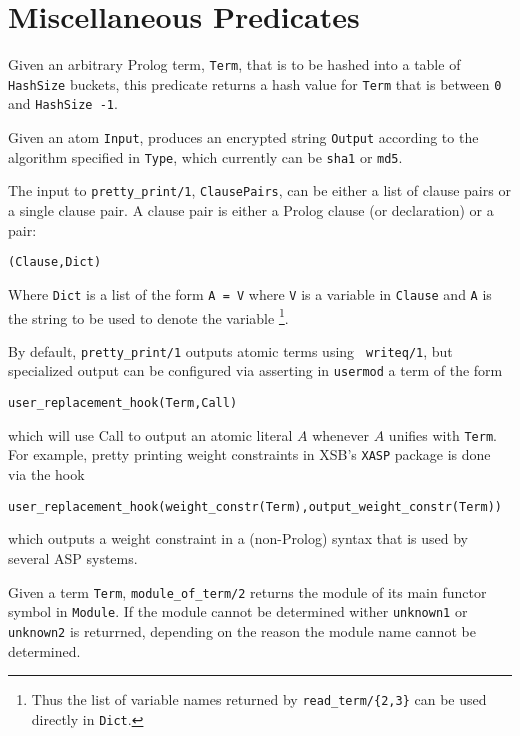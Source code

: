 \section{Miscellaneous Predicates}

\begin{description}

%
Given an arbitrary Prolog term, {\tt Term}, that is to be hashed into
a table of {\tt HashSize} buckets, this predicate returns a hash value
for {\tt Term} that is between {\tt 0} and {\tt HashSize -1}.

%
Given an atom {\tt Input}, produces an encrypted string {\tt Output}
according to the algorithm specified in {\tt Type}, which currently
can be {\tt sha1} or {\tt md5}.



%
The input to {\tt pretty\_print/1}, {\tt ClausePairs}, can be either a
list of clause pairs or a single clause pair.  A clause pair is either
a Prolog clause (or declaration) or a pair:
%
\begin{center}
{\tt (Clause,Dict)} 
\end{center}
%
Where {\tt Dict} is a list of the form {\tt A = V} where {\tt V} is a
variable in {\tt Clause} and {\tt A} is the string to be used to
denote the variable \footnote{Thus the list of variable names returned
by {\tt read\_term/\{2,3\}} can be used directly in {\tt Dict}.}.

By default, {\tt pretty\_print/1} outputs atomic terms using {\tt
writeq/1}, but specialized output can be configured via asserting in
{\tt usermod} a term of the form
%
\begin{center}
{\tt user\_replacement\_hook(Term,Call)}
\end{center}
%
which will use Call to output an atomic literal $A$ whenever $A$
unifies with {\tt Term}.  For example, pretty printing weight
constraints in XSB's {\tt XASP} package is done via the hook
%
\begin{center}
{\tt user\_replacement\_hook(weight\_constr(Term),output\_weight\_constr(Term))}
\end{center}
%
which outputs a weight constraint in a (non-Prolog) syntax that is 
used by several ASP systems.

%
Given a term {\tt Term}, {\tt module\_of\_term/2} returns the module
of its main functor symbol in {\tt Module}.  If the module cannot be
determined wither {\tt unknown1} or {\tt unknown2} is returrned,
depending on the reason the module name cannot be determined.

\end{description}

